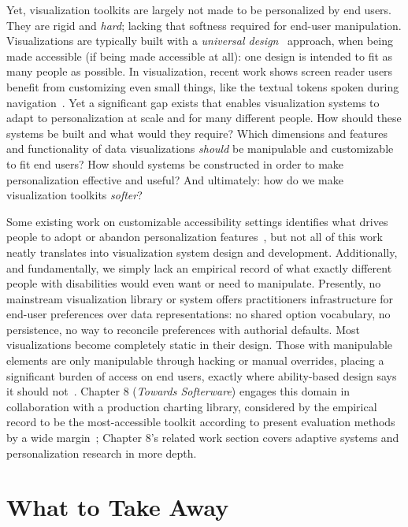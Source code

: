 \documentclass[12pt]{cmuthesis}
\begin{document}
Yet, visualization toolkits are largely not made to be personalized by end users. They are rigid and \textit{hard}; lacking that softness required for end-user manipulation. Visualizations are typically built with a \textit{universal design}~\cite{Hamraie2017Building} approach, when being made accessible (if being made accessible at all): one design is intended to fit as many people as possible. In visualization, recent work shows screen reader users benefit from customizing even small things, like the textual tokens spoken during navigation~\cite{Jones2024}. Yet a significant gap exists that enables visualization systems to adapt to personalization at scale and for many different people. How should these systems be built and what would they require? Which dimensions and features and functionality of data visualizations \textit{should} be manipulable and customizable to fit end users? How should systems be constructed in order to make personalization effective and useful? And ultimately: how do we make visualization toolkits \textit{softer}?

Some existing work on customizable accessibility settings identifies what drives people to adopt or abandon personalization features~\cite{Wood2023}, but not all of this work neatly translates into visualization system design and development. Additionally, and fundamentally, we simply lack an empirical record of what exactly different people with disabilities would even want or need to manipulate. Presently, no mainstream visualization library or system offers practitioners infrastructure for end-user preferences over data representations: no shared option vocabulary, no persistence, no way to reconcile preferences with authorial defaults. Most visualizations become completely static in their design. Those with manipulable elements are only manipulable through hacking or manual overrides, placing a significant burden of access on end users, exactly where ability-based design says it should not~\cite{Wobbrock2011Ability}. Chapter 8 (\textit{Towards Softerware}) engages this domain in collaboration with a production charting library, considered by the empirical record to be the most-accessible toolkit according to present evaluation methods by a wide margin~\cite{Kim2023Beyond}; Chapter 8's related work section covers adaptive systems and personalization research in more depth.
 
\section{What to Take Away}
 
\end{document}
